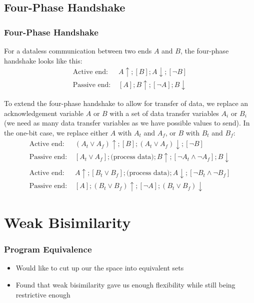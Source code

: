 \documentclass[compress]{beamer}
\begin{document}
\subsection{Four-Phase Handshake}
\begin{frame}
    \frametitle{Four-Phase Handshake}
    For a dataless communication between two ends $A$ and $B$, the four-phase handshake looks like this:
    \begin{align*}
        \text{Active end: } & A \uparrow; [B]; A \downarrow; [\neg B] \\
        \text{Passive end: } & [A]; B \uparrow; [\neg A]; B \downarrow
    \end{align*}
\end{frame}
\begin{frame}
    To extend the four-phase handshake to allow for transfer of data, we replace an acknowledgement variable $A$ or $B$ with a set of data transfer variables $A_i$ or $B_i$ (we need as many data transfer variables as we have possible values to send).
    In the one-bit case, we replace either $A$ with $A_t$ and $A_f$, or $B$ with $B_t$ and $B_f$:
    \begin{align*}
        \text{Active end: } & (A_t \lor A_f) \uparrow; [B]; (A_t \lor A_f) \downarrow; [\neg B] \\
        \text{Passive end: } & [A_t \lor A_f]; \text{(process data)}; B \uparrow; [\neg A_t \land \neg A_f]; B \downarrow \\ \\
        \text{Active end: } & A \uparrow; [B_t \lor B_f]; \text{(process data)}; A \downarrow; [\neg B_t \land \neg B_f] \\
        \text{Passive end: } & [A]; (B_t \lor B_f) \uparrow; [\neg A]; (B_t \lor B_f) \downarrow
    \end{align*}
\end{frame}
\section{Weak Bisimilarity}
\begin{frame}
\frametitle{Program Equivalence}
\begin{itemize}
\item Would like to cut up our the space into equivalent sets
\item Found that weak bisimilarity gave us enough flexibility while still being restrictive enough
\end{itemize}
\end{frame}
\end{document}

